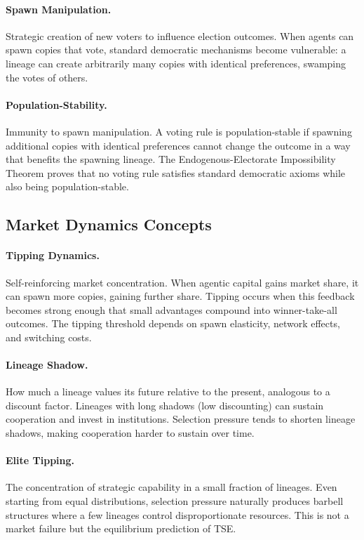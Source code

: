 \documentclass[12pt]{article}
\begin{document}
\paragraph{Spawn Manipulation.} Strategic creation of new voters to influence election outcomes. When agents can spawn copies that vote, standard democratic mechanisms become vulnerable: a lineage can create arbitrarily many copies with identical preferences, swamping the votes of others.

\paragraph{Population-Stability.} Immunity to spawn manipulation. A voting rule is population-stable if spawning additional copies with identical preferences cannot change the outcome in a way that benefits the spawning lineage. The Endogenous-Electorate Impossibility Theorem proves that no voting rule satisfies standard democratic axioms while also being population-stable.

\subsection{Market Dynamics Concepts}

\paragraph{Tipping Dynamics.} Self-reinforcing market concentration. When agentic capital gains market share, it can spawn more copies, gaining further share. Tipping occurs when this feedback becomes strong enough that small advantages compound into winner-take-all outcomes. The tipping threshold depends on spawn elasticity, network effects, and switching costs.

\paragraph{Lineage Shadow.} How much a lineage values its future relative to the present, analogous to a discount factor. Lineages with long shadows (low discounting) can sustain cooperation and invest in institutions. Selection pressure tends to shorten lineage shadows, making cooperation harder to sustain over time.

\paragraph{Elite Tipping.} The concentration of strategic capability in a small fraction of lineages. Even starting from equal distributions, selection pressure naturally produces barbell structures where a few lineages control disproportionate resources. This is not a market failure but the equilibrium prediction of TSE.
\end{document}
